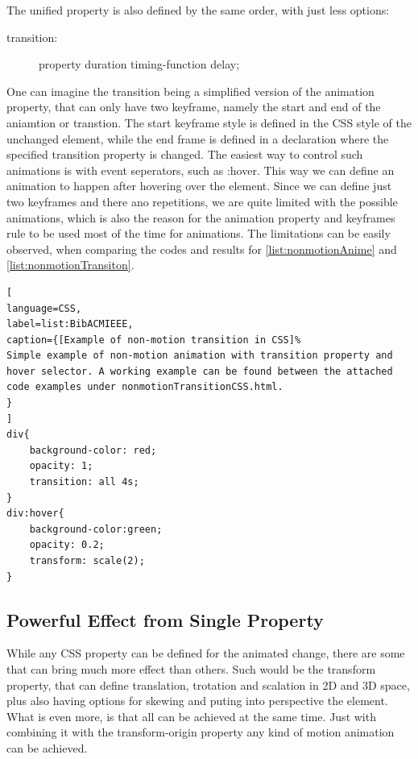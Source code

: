 The unified property is also defined by the same order, with just less options:

\begin{description}
\item [transition:] property duration timing-function delay;
\end{description}

One can imagine the transition being a simplified version of the animation property, that can only have two keyframe, namely the start and end of the aniamtion or transtion. The start keyframe style is defined in the CSS style of the unchanged element, while the end frame is defined in a declaration where the specified transition property is changed. The easiest way to control such animations is with event seperators, such as :hover. This way we can define an animation to happen after hovering over the element. Since we can define just two keyframes and there ano repetitions, we are quite limited with the possible animations, which is also the reason for the animation property and keyframes rule to be used most of the time for animations. The limitations can be easily observed, when comparing the codes and results for \ref{list:nonmotionAnime} and \ref{list:nonmotionTransiton}.

\begin{lstlisting}[
language=CSS,
label=list:BibACMIEEE,
caption={[Example of non-motion transition in CSS]%
Simple example of non-motion animation with transition property and hover selector. A working example can be found between the attached code examples under nonmotionTransitionCSS.html.
}
]
div{
	background-color: red;
	opacity: 1;
	transition: all 4s;
}
div:hover{
	background-color:green;
	opacity: 0.2;
	transform: scale(2);
}
\end{lstlisting}
\label{list:nonmotionTransiton}



\subsection{Powerful Effect from Single Property} %
\label{sub:transformCSS}

While any CSS property can be defined for the animated change, there are some that can bring much more effect than others. Such would be the transform property, that can define translation, trotation and scalation in 2D and 3D space, plus also having options for skewing and puting into perspective the element. What is even more, is that all can be achieved at the same time. Just with combining it with the transform-origin property any kind of motion animation can be achieved.


